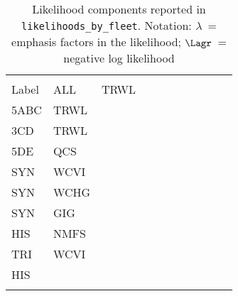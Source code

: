 \begin{longtable}[c]{>{\raggedleft\let\newline\\\arraybackslash\hspace{0pt}}p{1.0in}>{\raggedleft\let\newline\\\arraybackslash\hspace{0pt}}p{0.55in}>{\raggedleft\let\newline\\\arraybackslash\hspace{0pt}}p{0.55in}>{\raggedleft\let\newline\\\arraybackslash\hspace{0pt}}p{0.55in}>{\raggedleft\let\newline\\\arraybackslash\hspace{0pt}}p{0.55in}>{\raggedleft\let\newline\\\arraybackslash\hspace{0pt}}p{0.55in}>{\raggedleft\let\newline\\\arraybackslash\hspace{0pt}}p{0.55in}>{\raggedleft\let\newline\\\arraybackslash\hspace{0pt}}p{0.55in}>{\raggedleft\let\newline\\\arraybackslash\hspace{0pt}}p{0.55in}>{\raggedleft\let\newline\\\arraybackslash\hspace{0pt}}p{0.55in}>{\raggedleft\let\newline\\\arraybackslash\hspace{0pt}}p{0.55in}}
  \caption{Likelihood components reported in \texttt{likelihoods\_by\_fleet}. Notation: $\lambda$~= emphasis factors in the likelihood; $\Lagr$~= negative log likelihood} \label{tab:like3}\\  \hline\\[-2.2ex]
  Label  & ALL & TRWL\newline 5ABC & TRWL\newline 3CD & TRWL\newline 5DE & QCS\newline SYN & WCVI\newline SYN & WCHG\newline SYN & GIG\newline HIS & NMFS\newline TRI & WCVI\newline HIS \\[0.2ex]\hline\\[-1.5ex]  \endfirsthead   \hline  

\end{longtable}
